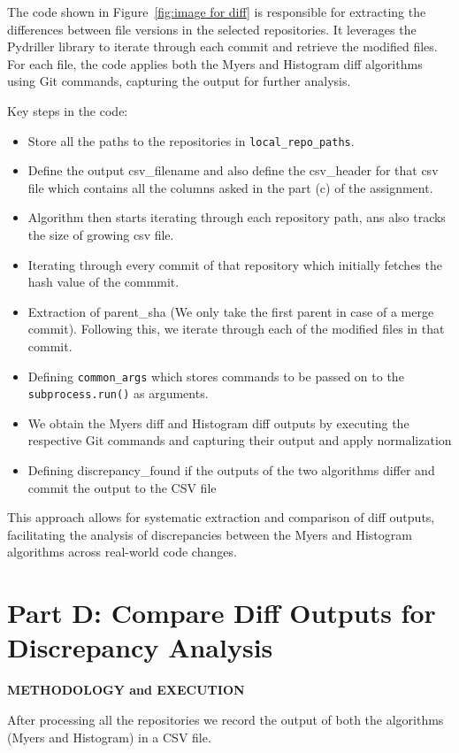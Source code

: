 \documentclass[12pt, a4paper]{report}
\newcommand{\sectionbar}[1]{%
  \vspace{0.6\baselineskip}%
  \noindent
  \colorbox{sectionbar}{%
    \parbox{\dimexpr\linewidth-2\fboxsep\relax}{%
      \textbf{\Large\textsf{#1}}%
    }%
  }%
  \vspace{0.6\baselineskip}
}
\begin{document}
The code shown in Figure~\ref{fig:image for diff} is responsible for extracting the differences between file versions in the selected repositories. It leverages the Pydriller library to iterate through each commit and retrieve the modified files. For each file, the code applies both the Myers and Histogram diff algorithms using Git commands, capturing the output for further analysis.

Key steps in the code:
\begin{itemize}
    \item Store all the paths to the repositories in \texttt{local\_repo\_paths}.
    \item Define the output csv\_filename and also define the csv\_header for that csv file which contains all the columns asked in the part (c) of the assignment.
    \item Algorithm then starts iterating through each repository path, ans also tracks the size of growing csv file.
    \item Iterating through every commit of that repository which initially fetches the hash value of the commmit.
    \item Extraction of parent\_sha (We only take the first parent in case of a merge commit). Following this, we iterate through each of the modified files in that commit.
    \item Defining \texttt{common\_args} which stores commands to be passed on to the \texttt{subprocess.run()} as arguments.
    \item We obtain the Myers diff and Histogram diff outputs by executing the respective Git commands and capturing their output and apply normalization
    \item Defining discrepancy\_found if the outputs of the two algorithms differ and commit the output to the CSV file
\end{itemize}

This approach allows for systematic extraction and comparison of diff outputs, facilitating the analysis of discrepancies between the Myers and Histogram algorithms across real-world code changes.

\section{Part D: Compare Diff Outputs for Discrepancy Analysis}

\sectionbar{METHODOLOGY and EXECUTION}

After processing all the repositories we record the output of both the algorithms (Myers and Histogram) in a CSV file.
\end{document}
